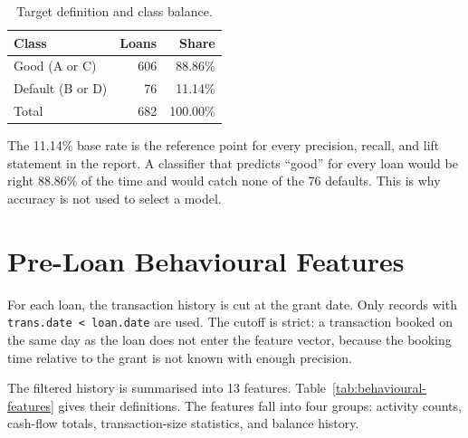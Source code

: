 \begin{table}[H]
    \centering
    \caption{Target definition and class balance.}
    \label{tab:target-balance}
    \begin{tabular}{@{}lrr@{}}
        \toprule
        \textbf{Class} & \textbf{Loans} & \textbf{Share} \\
        \midrule
        Good (A or C) & 606 & 88.86\% \\
        Default (B or D) & 76 & 11.14\% \\
        \midrule
        Total & 682 & 100.00\% \\
        \bottomrule
    \end{tabular}
\end{table}

The 11.14\% base rate is the reference point for every precision, recall, and lift statement in the report. A classifier that predicts ``good'' for every loan would be right 88.86\% of the time and would catch none of the 76 defaults. This is why accuracy is not used to select a model.

\section{Pre-Loan Behavioural Features}
\label{sec:behavioural-features}

For each loan, the transaction history is cut at the grant date. Only records with \texttt{trans.date < loan.date} are used. The cutoff is strict: a transaction booked on the same day as the loan does not enter the feature vector, because the booking time relative to the grant is not known with enough precision.

The filtered history is summarised into 13 features. Table~\ref{tab:behavioural-features} gives their definitions. The features fall into four groups: activity counts, cash-flow totals, transaction-size statistics, and balance history.


